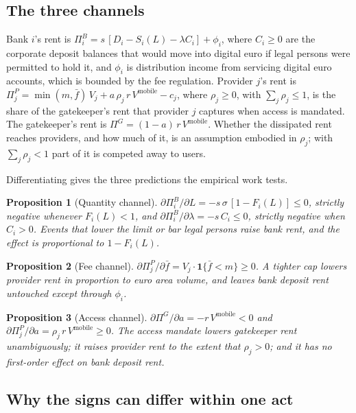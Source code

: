 \documentclass[11pt]{article}
\theoremstyle{plain}\newtheorem{proposition}{Proposition}
\begin{document}
\subsection{The three channels}

Bank $i$'s rent is $\Pi^B_i = s\,[D_i - S_i(L) - \lambda C_i] + \phi_i$, where $C_i \ge 0$ are the corporate deposit balances that would move into digital euro if legal persons were permitted to hold it, and $\phi_i$ is distribution income from servicing digital euro accounts, which is bounded by the fee regulation. Provider $j$'s rent is $\Pi^P_j = \min(m, \bar f)\, V_j + a\,\rho_j\, r\, V^{\mathrm{mobile}} - c_j$, where $\rho_j \ge 0$, with $\sum_j \rho_j \le 1$, is the share of the gatekeeper's rent that provider $j$ captures when access is mandated. The gatekeeper's rent is $\Pi^G = (1-a)\, r\, V^{\mathrm{mobile}}$. Whether the dissipated rent reaches providers, and how much of it, is an assumption embodied in $\rho_j$; with $\sum_j\rho_j<1$ part of it is competed away to users.

Differentiating gives the three predictions the empirical work tests.

\begin{proposition}[Quantity channel]\label{prop:quantity}
$\partial \Pi^B_i / \partial L = -s\,\sigma\,[1-F_i(L)] \le 0$, strictly negative whenever $F_i(L)<1$, and $\partial \Pi^B_i / \partial \lambda = -s\,C_i \le 0$, strictly negative when $C_i>0$. Events that lower the limit or bar legal persons raise bank rent, and the effect is proportional to $1 - F_i(L)$.
\end{proposition}

\begin{proposition}[Fee channel]\label{prop:fee}
$\partial \Pi^P_j / \partial \bar f = V_j \cdot \mathbf{1}\{\bar f < m\} \ge 0$. A tighter cap lowers provider rent in proportion to euro area volume, and leaves bank deposit rent untouched except through $\phi_i$.
\end{proposition}

\begin{proposition}[Access channel]\label{prop:access}
$\partial \Pi^G / \partial a = -r\,V^{\mathrm{mobile}} < 0$ and $\partial \Pi^P_j / \partial a = \rho_j\, r\, V^{\mathrm{mobile}} \ge 0$. The access mandate lowers gatekeeper rent unambiguously; it raises provider rent to the extent that $\rho_j>0$; and it has no first-order effect on bank deposit rent.
\end{proposition}

\subsection{Why the signs can differ within one act}
\end{document}
